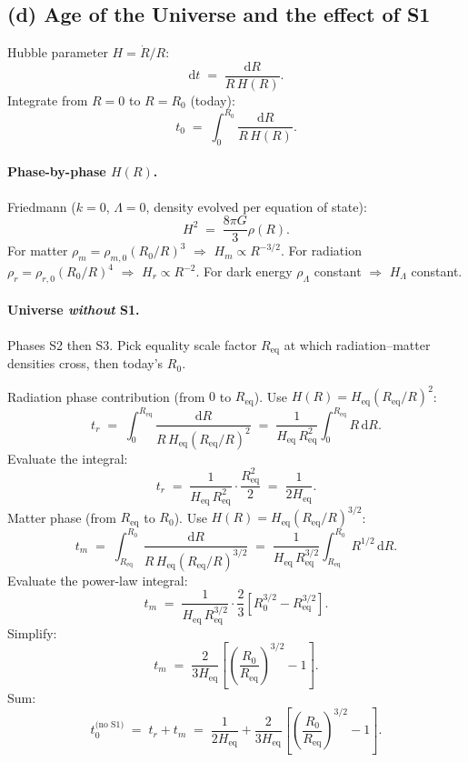\documentclass[11pt]{article}
\newcommand{\de}{\mathrm{d}}
\begin{document}
\subsection*{(d) Age of the Universe and the effect of S1}

Hubble parameter $H=\dot R/R$:
\[
\de t \;=\; \frac{\de R}{R\,H(R)}.
\]
Integrate from $R=0$ to $R=R_0$ (today):
\begin{equation}
\boxed{\;t_0 \;=\; \int_{0}^{R_0}\frac{\de R}{R\,H(R)}.\;}
\label{eq:age}
\end{equation}

\paragraph{Phase-by-phase $H(R)$.}
Friedmann ($k=0$, $\Lambda=0$, density evolved per equation of state):
\[
H^2 \;=\; \frac{8\pi G}{3}\rho(R).
\]
For matter $\rho_m = \rho_{m,0}(R_0/R)^3$ $\Rightarrow$ $H_m\propto R^{-3/2}$. For radiation $\rho_r = \rho_{r,0}(R_0/R)^4$ $\Rightarrow$ $H_r\propto R^{-2}$. For dark energy $\rho_\Lambda$ constant $\Rightarrow$ $H_\Lambda$ constant.

\paragraph{Universe \emph{without} S1.}
Phases S2 then S3. Pick equality scale factor $R_{\text{eq}}$ at which radiation--matter densities cross, then today's $R_0$.

Radiation phase contribution (from $0$ to $R_{\text{eq}}$). Use $H(R)=H_{\text{eq}}(R_{\text{eq}}/R)^2$:
\[
t_r \;=\; \int_0^{R_{\text{eq}}}\frac{\de R}{R\,H_{\text{eq}}(R_{\text{eq}}/R)^2} \;=\; \frac{1}{H_{\text{eq}}\,R_{\text{eq}}^2}\int_0^{R_{\text{eq}}}R\,\de R.
\]
Evaluate the integral:
\[
t_r \;=\; \frac{1}{H_{\text{eq}}\,R_{\text{eq}}^2}\cdot\frac{R_{\text{eq}}^2}{2} \;=\; \frac{1}{2 H_{\text{eq}}}.
\]
Matter phase (from $R_{\text{eq}}$ to $R_0$). Use $H(R)=H_{\text{eq}}(R_{\text{eq}}/R)^{3/2}$:
\[
t_m \;=\; \int_{R_{\text{eq}}}^{R_0}\frac{\de R}{R\,H_{\text{eq}}(R_{\text{eq}}/R)^{3/2}} \;=\; \frac{1}{H_{\text{eq}}\,R_{\text{eq}}^{3/2}}\int_{R_{\text{eq}}}^{R_0}R^{1/2}\,\de R.
\]
Evaluate the power-law integral:
\[
t_m \;=\; \frac{1}{H_{\text{eq}}\,R_{\text{eq}}^{3/2}}\cdot\frac{2}{3}\!\left[R_0^{3/2}-R_{\text{eq}}^{3/2}\right].
\]
Simplify:
\[
t_m \;=\; \frac{2}{3 H_{\text{eq}}}\!\left[\!\left(\frac{R_0}{R_{\text{eq}}}\right)^{\!3/2}-1\right].
\]
Sum:
\[
t_0^{\text{(no S1)}} \;=\; t_r + t_m \;=\; \frac{1}{2 H_{\text{eq}}} + \frac{2}{3 H_{\text{eq}}}\!\left[\!\left(\frac{R_0}{R_{\text{eq}}}\right)^{\!3/2}-1\right].
\]
\end{document}
